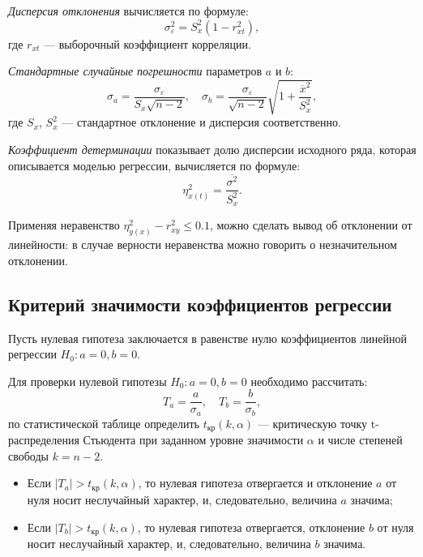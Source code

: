 \textit{Дисперсия отклонения} вычисляется по формуле:
\begin{equation*}
	\sigma_{\varepsilon}^2 = S_x^2(1 - r_{xt}^2),
\end{equation*}
где $r_{xt}$ --- выборочный коэффициент корреляции.

\textit{Стандартные случайные погрешности} параметров $a$ и $b$:
\begin{equation*}
	\sigma_a = \frac{\sigma_{\varepsilon }}{S_x \sqrt{n - 2}}, \quad \sigma_b = \frac{\sigma_{\varepsilon}}{\sqrt{n-2}} \sqrt{1 + \frac{\overline{x}^2}{S_x^2}},
\end{equation*}
где $S_x$, $S_x^2$ --- стандартное отклонение и дисперсия соответственно.

\textit{Коэффициент детерминации} показывает долю дисперсии исходного ряда, которая описывается моделью регрессии, вычисляется по формуле:
\begin{equation*}
	\eta_{x(t)}^2 = \frac{\overline{\sigma^2}}{S_x^2}.
\end{equation*}

Применяя неравенство $\eta_{y(x)}^2 - r_{xy}^2 \le 0.1$, можно сделать вывод об отклонении от линейности: в случае верности неравенства можно говорить о незначительном отклонении.

\subsection*{Критерий значимости коэффициентов регрессии} %
\label{subsec:sign_regr}

Пусть нулевая гипотеза заключается в равенстве нулю коэффициентов линейной регрессии $H_0: a=0, b=0$.

Для проверки нулевой гипотезы $H_0: a=0, b=0$ необходимо рассчитать:
\begin{equation*}
	T_a = \frac{a}{\sigma_a}, \quad T_b = \frac{b}{\sigma_b},
\end{equation*}
по статистической таблице определить $t_{\textrm{кр}} \left( k, \alpha \right)$ --- критическую точку t-распределения Стьюдента при заданном уровне значимости $\alpha$ и числе степеней свободы $k = n - 2$.
\begin{itemize}
	\item Если $\left| T_a \right| > t_{\textrm{кр}} \left( k, \alpha \right)$, то нулевая гипотеза	отвергается и отклонение $a$ от нуля носит неслучайный характер, и, следовательно, величина $a$ значима;
	\item Если $\vert T_b \vert > t_{\textrm{кр}} \left( k, \alpha \right)$, то нулевая гипотеза отвергается, отклонение $b$ от нуля носит неслучайный характер, и, следовательно, величина $b$ значима.
\end{itemize}

